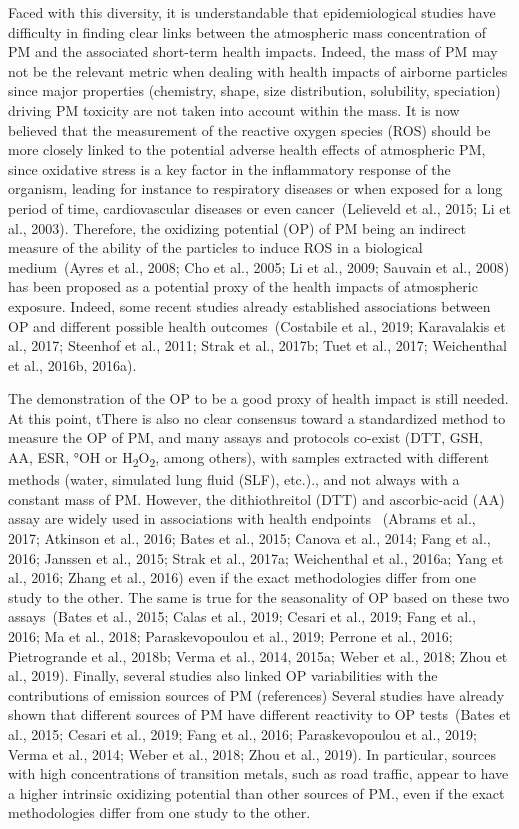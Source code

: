 \documentclass[
]{article}
\begin{document}
Faced with this diversity, it is understandable that epidemiological
studies have difficulty in finding clear links between the atmospheric
mass concentration of PM and the associated short-term health impacts.
Indeed, the mass of PM may not be the relevant metric when dealing with
health impacts of airborne particles since major properties (chemistry,
shape, size distribution, solubility, speciation) driving PM toxicity
are not taken into account within the mass. It is now believed that the
measurement of the reactive oxygen species (ROS) should be more closely
linked to the potential adverse health effects of atmospheric PM, since
oxidative stress is a key factor in the inflammatory response of the
organism, leading for instance to respiratory diseases or when exposed
for a long period of time, cardiovascular diseases or even
cancer~(Lelieveld et al., 2015; Li et al., 2003). Therefore, the
oxidizing potential (OP) of PM being an indirect measure of the ability
of the particles to induce ROS in a biological medium~(Ayres et al.,
2008; Cho et al., 2005; Li et al., 2009; Sauvain et al., 2008) has been
proposed as a potential proxy of the health impacts of atmospheric
exposure. Indeed, some recent studies already established associations
between OP and different possible health outcomes~(Costabile et al.,
2019; Karavalakis et al., 2017; Steenhof et al., 2011; Strak et al.,
2017b; Tuet et al., 2017; Weichenthal et al., 2016b, 2016a).

The demonstration of the OP to be a good proxy of health impact is still
needed. At this point, tThere is also no clear consensus toward a
standardized method to measure the OP of PM, and many assays and
protocols co-exist (DTT, GSH, AA, ESR, °OH or
H\textsubscript{2}O\textsubscript{2}, among others), with samples
extracted with different methods (water, simulated lung fluid (SLF),
etc.)., and not always with a constant mass of PM. However, the
dithiothreitol (DTT) and ascorbic-acid (AA) assay are widely used in
associations with health endpoints ~(Abrams et al., 2017; Atkinson et
al., 2016; Bates et al., 2015; Canova et al., 2014; Fang et al., 2016;
Janssen et al., 2015; Strak et al., 2017a; Weichenthal et al., 2016a;
Yang et al., 2016; Zhang et al., 2016) even if the exact methodologies
differ from one study to the other. The same is true for the seasonality
of OP based on these two assays~(Bates et al., 2015; Calas et al., 2019;
Cesari et al., 2019; Fang et al., 2016; Ma et al., 2018; Paraskevopoulou
et al., 2019; Perrone et al., 2016; Pietrogrande et al., 2018b; Verma et
al., 2014, 2015a; Weber et al., 2018; Zhou et al., 2019). Finally,
several studies also linked OP variabilities with the contributions of
emission sources of PM (references) Several studies have already shown
that different sources of PM have different reactivity to OP
tests~(Bates et al., 2015; Cesari et al., 2019; Fang et al., 2016;
Paraskevopoulou et al., 2019; Verma et al., 2014; Weber et al., 2018;
Zhou et al., 2019). In particular, sources with high concentrations of
transition metals, such as road traffic, appear to have a higher
intrinsic oxidizing potential than other sources of PM., even if the
exact methodologies differ from one study to the other.
\end{document}
